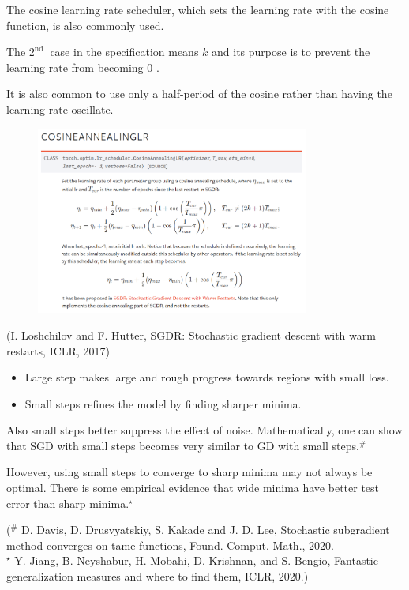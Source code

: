 \documentclass{report}
\begin{document}
\begin{concept}
    The cosine learning rate scheduler, which sets the learning rate with the cosine function, is also commonly used.

    The $2^{\text {nd }}$ case in the specification means $k$ and its purpose is to prevent the learning rate from becoming 0 .

    It is also common to use only a half-period of the cosine rather than having the learning rate oscillate.

    \begin{figure}[H]
        \centering
        \includegraphics[width=0.8\textwidth]{.././assets/6.10.png}
    \end{figure}

    (I. Loshchilov and F. Hutter, SGDR: Stochastic gradient descent with warm restarts, ICLR, 2017)
\end{concept}

\begin{concept}
    \begin{itemize}
        \item Large step makes large and rough progress towards regions with small loss.
        \item Small steps refines the model by finding sharper minima.
    \end{itemize}

    Also small steps better suppress the effect of noise. Mathematically, one can show that SGD with small steps becomes very similar to GD with small steps.${ }^{\#}$

    However, using small steps to converge to sharp minima may not always be optimal. There is some empirical evidence that wide minima have better test error than sharp minima.${ }^{\star}$

    (${ }^{\#}$ D. Davis, D. Drusvyatskiy, S. Kakade and J. D. Lee, Stochastic subgradient method converges on tame functions, Found. Comput. Math., 2020.\\
    ${ }^{\star}$ Y. Jiang, B. Neyshabur, H. Mobahi, D. Krishnan, and S. Bengio, Fantastic generalization measures and where to find them, ICLR, 2020.)
\end{concept}
\end{document}
